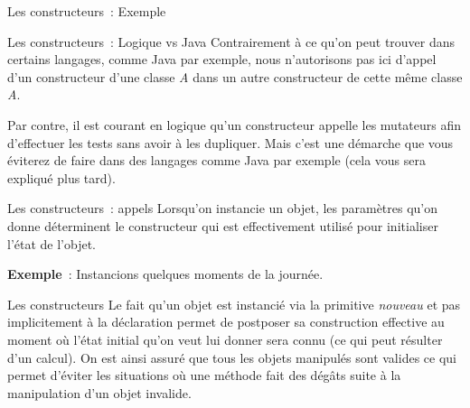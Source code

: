\begin{frame}{Les constructeurs~: Exemple}
\end{frame}

\begin{frame}{Les constructeurs~: Logique vs Java}
	Contrairement à ce qu'on peut trouver dans certains langages, 
	comme Java par exemple, nous n'autorisons pas ici d'appel 
	d'un constructeur d'une classe \textit{A} dans un autre constructeur 
	de cette même classe \textit{A}.
	
	\bigskip
	
	Par contre, il est courant en logique qu'un constructeur 
	appelle les mutateurs afin d'effectuer les tests sans 
	avoir à les dupliquer.
	Mais c'est une démarche que vous éviterez de faire dans
	des langages comme Java par exemple 
	(cela vous sera expliqué plus tard).
	
\end{frame}

\begin{frame}{Les constructeurs~: appels}
	Lorsqu'on instancie un objet, les paramètres
	qu'on donne déterminent le constructeur qui est
	effectivement utilisé pour initialiser l'état de
	l'objet.

	\textbf{Exemple}~: Instancions quelques moments de la journée.
	
\end{frame}


\begin{frame}{Les constructeurs}
	Le fait qu'un objet est instancié via la primitive
	\textit{nouveau} et pas implicitement à la déclaration permet de
	postposer sa construction effective au moment où
	l'état initial qu'on veut lui donner
	sera connu (ce qui peut résulter d'un calcul). On est
	ainsi assuré que tous les objets manipulés sont valides ce qui permet
	d’éviter les situations où une méthode fait des dégâts suite à la
	manipulation d’un objet invalide.
\end{frame}

